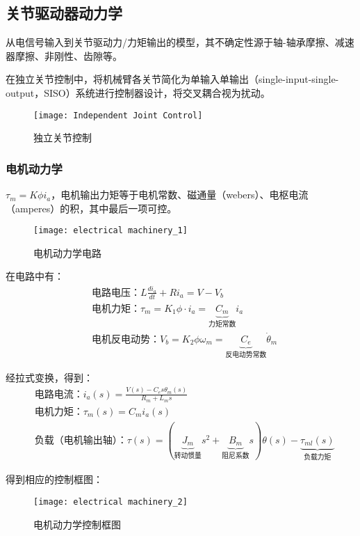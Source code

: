 \documentclass[
12pt, %
a4paper, 
oneside, %
headinclude,footinclude, %
]{scrartcl}
\begin{document}
\subsection[关节驱动器动力学]{关节驱动器动力学}
从电信号输入到关节驱动力/力矩输出的模型，其不确定性源于轴-轴承摩擦、减速器摩擦、非刚性、齿隙等。

在独立关节控制中，将机械臂各关节简化为单输入单输出（single-input-single-output，SISO）系统进行控制器设计，将交叉耦合视为扰动。

\begin{figure}[H]
\centering 
\texttt{[image: Independent Joint Control]} 
\caption[独立关节控制]{独立关节控制}
\end{figure}
\subsubsection[电机动力学]{电机动力学}
$ \tau_m = K \phi i_a $，电机输出力矩等于电机常数、磁通量（webers）、电枢电流（amperes）的积，其中最后一项可控。

\begin{figure}[H]
\centering 
\texttt{[image: electrical machinery\_1]} 
\caption[电机动力学电路]{电机动力学电路}
\end{figure}

在电路中有：
\begin{align*} 
&\text{电路电压：} L\frac{di_a}{dt} + Ri_a = V - V_b \\
&\text{电机力矩：} \tau_m = K_1\phi \cdot i_a = \underbrace{C_m}_{\text{力矩常数}} i_a \\
&\text{电机反电动势：} V_b = K_2\phi\omega_m = \underbrace{C_e}_{\text{反电动势常数}} \dot{\theta}_m  
\end{align*}

经拉式变换，得到：
\begin{align*} 
&\text{电路电流：} i_a(s) = \frac{V(s) - C_e s\theta_m(s)}{R_m + L_m s} \\
&\text{电机力矩：} \tau_m(s) = C_m i_a(s) \\
&\text{负载（电机输出轴）：} \tau(s) = (\underbrace{J_m}_{\text{转动惯量}} s^2 + \underbrace{B_m}_{\text{阻尼系数}} s)\theta(s) - \underbrace{\tau_{ml}(s)}_{\text{负载力矩}} 
\end{align*}

得到相应的控制框图：
\begin{figure}[H]
\centering 
\texttt{[image: electrical machinery\_2]} 
\caption[电机动力学控制框图]{电机动力学控制框图}
\end{figure}
\end{document}
